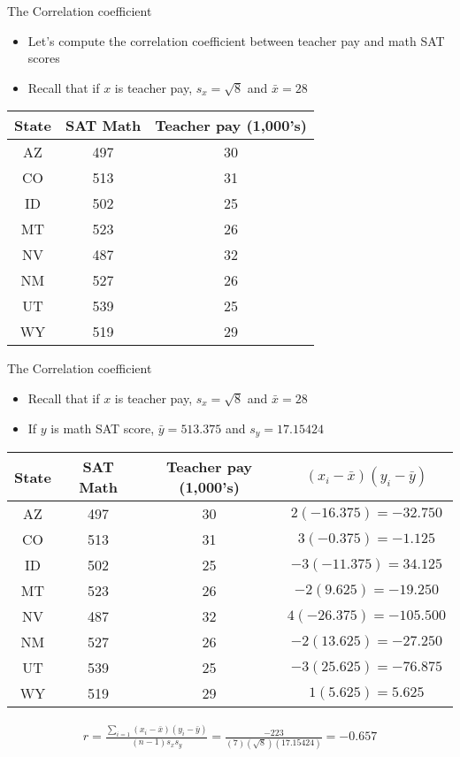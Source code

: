 \documentclass[xcolor=dvipsnames]{beamer}
\begin{document}
\begin{frame}{The Correlation coefficient}
	\begin{itemize}
		\item Let's compute the correlation coefficient between teacher pay and math SAT scores
		\item Recall that if $x$ is teacher pay, $s_x = \sqrt{8}$ and $\bar{x} = 28$
	\end{itemize}
	\begin{center}
		\begin{tabular}{|c|c|c|}
			\hline 
			\textbf{State} & \textbf{SAT Math} & \textbf{Teacher pay (1,000's)} \\ 
			\hline \hline
			AZ & 497  & 30 \\ \hline 
			CO & 513  & 31 \\ \hline 
			ID & 502  & 25  \\  \hline 
			MT & 523  & 26 \\ \hline 
			NV & 487  & 32 \\ \hline 
			NM & 527  & 26 \\ \hline 
			UT & 539  & 25 \\ \hline 
			WY & 519  & 29 \\ \hline 
		\end{tabular} 
	\end{center}
\end{frame}

\begin{frame}{The Correlation coefficient}
	\begin{itemize}
		\item Recall that if $x$ is teacher pay, $s_x = \sqrt{8}$ and $\bar{x} = 28$
		\item If $y$ is math SAT score, $\bar{y} = 513.375$ and $s_y = 17.15424$
	\end{itemize}
		{\small 
		\begin{tabular}{|c|c|c|c|}
			\hline 
			\textbf{State} & \textbf{SAT Math} & \textbf{Teacher pay (1,000's)} & $(x_i -\bar{x})(y_i - \bar{y})$\\ 
			\hline \hline
			AZ & 497  & 30 & $2 (-16.375) = -32.750$ \\ \hline 
			CO & 513  & 31 & $3 (-0.375) = -1.125 $ \\ \hline 
			ID & 502  & 25 & $-3 (-11.375) = 34.125$ \\  \hline 
			MT & 523  & 26 & $-2 (9.625) = -19.250$ \\ \hline 
			NV & 487  & 32 & $4(-26.375) = -105.500 $ \\ \hline 
			NM & 527  & 26 & $-2 (13.625) = -27.250$\\ \hline 
			UT & 539  & 25 & $-3 (25.625) =  -76.875$\\ \hline 
			WY & 519  & 29 & $1 (5.625) = 5.625$\\ \hline 
		\end{tabular} }
\begin{align*}
	r = \frac{\sum_{i=1}(x_i -\bar{x})(y_i - \bar{y})}{(n-1) s_x s_y} = \frac{-223}{(7)(\sqrt{8})(17.15424)} = -0.657
\end{align*}
\end{frame}
\end{document}
